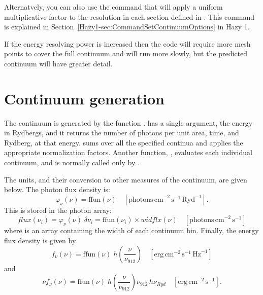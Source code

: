 Alternatvely, you can also use the command  that will apply a uniform multiplicative factor to the
resolution in each section defined in . This
command is explained in Section~\ref{Hazy1-sec:CommandSetContinuumOptions} in
Hazy 1.

If the energy resolving power is increased then the code will require more
mesh points to cover the full continuum and will run more slowly, but the
predicted continuum will have greater detail.

\section{Continuum generation}

The continuum is generated by the function .
 has a single argument,
the energy in Rydbergs, and it returns the number of photons per
unit area, time, and Rydberg, at that energy.
 sums over all the
specified continua and applies the appropriate normalization factors.
Another function, ,
evaluates each individual continuum, and is normally
called only by .

The units, and their conversion to other measures of the continuum, are
given below.  The photon flux density is:
\begin{equation}
{\varphi _\nu }(\nu ) = \mathrm{ffun}(\nu )\quad [\mathrm{photons\,
cm}^{-2} \, \mathrm{s}^{-1} \, \mathrm{Ryd}^{-1}] .
\end{equation}
This is stored in the photon array:
\begin{equation}
flux({\nu _i}) = {\varphi _\nu }(\nu )\;\delta {\nu _i} = \mathrm{ffun}({\nu _i})
\times widflx(\nu )\quad [\mathrm{photons\, cm}^{-2}\, \mathrm{s}^{-1}]
\end{equation}
where  is an array containing the width of
each continuum bin.
Finally, the energy flux density is given by
\begin{equation}
{f_\nu }(\nu ) = {\mathrm{ffun}}(\nu )\;h\left( {\frac{\nu }{{{\nu _{912}}}}}
\right)\quad
 [\mathrm{erg\, cm}^{-2}\, \mathrm{s}^{-1}\, \mathrm{Hz}^{-1}]
\end{equation}
and
\begin{equation}
\nu {f_\nu }(\nu ) = {\mathrm{ffun}}(\nu )\;h\left( {\frac{\nu }{{{\nu
_{912}}}}} \right){\nu _{912}}\,h{\nu _{Ryd}}\quad
[\mathrm{erg\, cm}^{-2}\, \mathrm{s}^{-1}].
\end{equation}

